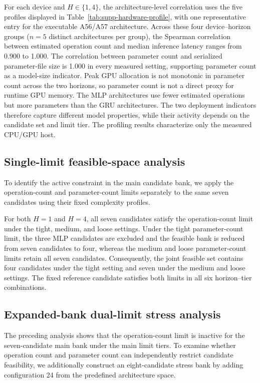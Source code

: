 \documentclass[11pt,a4paper]{article}
\begin{document}
For each device and $H\in\{1,4\}$, the architecture-level correlation
uses the five profiles displayed in Table~\ref{tab:supp-hardware-profile},
with one representative entry for the executable A56/A57 architecture.
Across these four device--horizon groups ($n=5$ distinct architectures per
group), the Spearman correlation between estimated operation count and
median inference latency ranges from 0.900 to 1.000. The correlation between
parameter count and serialized parameter-file size is 1.000 in every measured setting, supporting
parameter count as a model-size indicator. Peak GPU allocation is not
monotonic in parameter count across the two horizons, so parameter count is
not a direct proxy for runtime GPU memory. The MLP architectures use fewer
estimated operations but more parameters than the GRU architectures. The two
deployment indicators therefore capture different model properties, while
their activity depends on the candidate set and limit tier. The profiling
results characterize only the measured CPU/GPU host.

\subsection{Single-limit feasible-space analysis}

To identify the active constraint in the main candidate bank, we apply the
operation-count and parameter-count limits separately to the same seven
candidates using their fixed complexity profiles.

For both $H=1$ and $H=4$, all seven candidates satisfy the operation-count
limit under the tight, medium, and loose settings. Under the tight
parameter-count limit, the three MLP candidates are excluded and the
feasible bank is reduced from seven candidates to four, whereas the medium
and loose parameter-count limits retain all seven candidates. Consequently,
the joint feasible set contains four candidates under the tight setting and
seven under the medium and loose settings. The fixed reference candidate
satisfies both limits in all six horizon--tier combinations.

\subsection{Expanded-bank dual-limit stress analysis}

The preceding analysis shows that the operation-count limit is inactive for
the seven-candidate main bank under the main limit tiers.
To examine whether operation count and parameter count can independently
restrict candidate feasibility, we additionally construct an eight-candidate
stress bank by adding configuration 24 from the predefined architecture
space.
\end{document}
